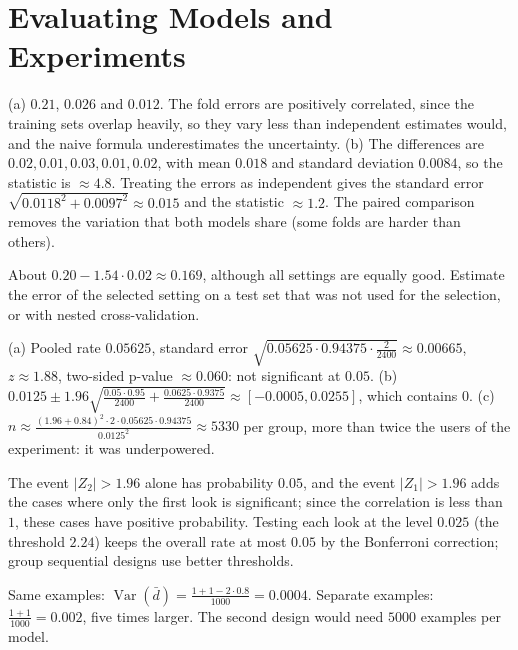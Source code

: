 \documentclass[11pt]{article}
\DeclareMathOperator{\Var}{Var}
\begin{document}
\section*{Evaluating Models and Experiments}

\begin{description}[leftmargin=0pt, itemsep=0.3em]
    \item[\ref{pr:cv-stats}.] (a) $0.21$, $0.026$ and $0.012$. The fold errors are positively correlated, since the training sets overlap heavily, so they vary less than independent estimates would, and the naive formula underestimates the uncertainty. (b) The differences are $0.02, 0.01, 0.03, 0.01, 0.02$, with mean $0.018$ and standard deviation $0.0084$, so the statistic is $\approx 4.8$. Treating the errors as independent gives the standard error $\sqrt{0.0118^2 + 0.0097^2} \approx 0.015$ and the statistic $\approx 1.2$. The paired comparison removes the variation that both models share (some folds are harder than others).
    \item[\ref{pr:winners-curse}.] About $0.20 - 1.54 \cdot 0.02 \approx 0.169$, although all settings are equally good. Estimate the error of the selected setting on a test set that was not used for the selection, or with nested cross-validation.
    \item[\ref{pr:ab-test}.] (a) Pooled rate $0.05625$, standard error $\sqrt{0.05625 \cdot 0.94375 \cdot \frac{2}{2400}} \approx 0.00665$, $z \approx 1.88$, two-sided p-value $\approx 0.060$: not significant at $0.05$. (b) $0.0125 \pm 1.96\sqrt{\frac{0.05 \cdot 0.95}{2400} + \frac{0.0625 \cdot 0.9375}{2400}} \approx [-0.0005, 0.0255]$, which contains $0$. (c) $n \approx \frac{(1.96 + 0.84)^2 \cdot 2 \cdot 0.05625 \cdot 0.94375}{0.0125^2} \approx 5330$ per group, more than twice the users of the experiment: it was underpowered.
    \item[\ref{pr:peeking}.] The event $|Z_2| > 1.96$ alone has probability $0.05$, and the event $|Z_1| > 1.96$ adds the cases where only the first look is significant; since the correlation is less than $1$, these cases have positive probability. Testing each look at the level $0.025$ (the threshold $2.24$) keeps the overall rate at most $0.05$ by the Bonferroni correction; group sequential designs use better thresholds.
    \item[\ref{pr:paired-design}.] Same examples: $\Var(\bar d) = \frac{1 + 1 - 2 \cdot 0.8}{1000} = 0.0004$. Separate examples: $\frac{1 + 1}{1000} = 0.002$, five times larger. The second design would need $5000$ examples per model.

\end{description}
\end{document}
